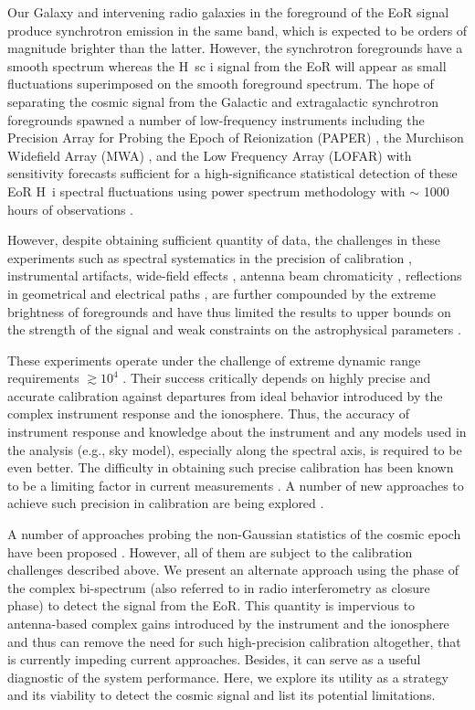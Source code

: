 \documentclass[
reprint,
superscriptaddress,
amsmath,
amssymb,
aps,
]{revtex4-1}
\begin{document}
Our Galaxy and intervening radio galaxies in the foreground of the EoR signal produce synchrotron emission in the same band, which is expected to be orders of magnitude brighter than the latter. However, the synchrotron foregrounds have a smooth spectrum whereas the H~{sc i} signal from the EoR will appear as small fluctuations superimposed on the smooth foreground spectrum. The hope of separating the cosmic signal from the Galactic and extragalactic synchrotron foregrounds spawned a number of low-frequency instruments including the Precision Array for Probing the Epoch of Reionization (PAPER) \cite{par10}, the Murchison Widefield Array (MWA) \cite{tin13}, and the Low Frequency Array (LOFAR) \cite{van13} with sensitivity forecasts sufficient for a high-significance statistical detection of these EoR H~{\sc i} spectral fluctuations using power spectrum methodology with $\sim$ 1000 hours of observations \cite{bea13,thy13}. 

However, despite obtaining sufficient quantity of data, the challenges in these experiments such as spectral systematics in the precision of calibration \cite{barry16}, instrumental artifacts, wide-field effects \cite{thy15a,thy15b}, antenna beam chromaticity \cite{thy16}, reflections in geometrical and electrical paths \cite{thy16}, are further compounded by the extreme brightness of foregrounds and have thus limited the results to upper bounds on the strength of the signal \cite{pac13,ali15,patil17} and weak constraints on the astrophysical parameters \cite{pob15}. 

These experiments operate under the challenge of extreme dynamic range requirements $\gtrsim 10^4$ \cite{dim02,ali08,ber09,ber10,dat10,gho12}. Their success critically depends on highly precise and accurate calibration against departures from ideal behavior introduced by the complex instrument response and the ionosphere. Thus, the accuracy of instrument response and knowledge about the instrument and any models used in the analysis (e.g., sky model), especially along the spectral axis, is required to be even better. The difficulty in obtaining such precise calibration \cite[for e.g.,][]{barry16,tro16} has been known to be a limiting factor in current measurements \cite{ali15,patil16,patil17}. A number of new approaches to achieve such precision in calibration are being explored \cite{liu10,zhe14,sie17,dil17}.

A number of approaches probing the non-Gaussian statistics of the cosmic epoch have been proposed \cite{lid07,bar08,harker09,wat14,kit16,ali06,son15,shi16,maj17}. However, all of them are subject to the calibration challenges described above. We present an alternate approach using the phase of the complex bi-spectrum (also referred to in radio interferometry as closure phase) to detect the signal from the EoR. This quantity is impervious to antenna-based complex gains introduced by the instrument and the ionosphere and thus can remove the need for such high-precision calibration altogether, that is currently impeding current approaches. Besides, it can serve as a useful diagnostic of the system performance. Here, we explore its utility as a strategy and its viability to detect the cosmic signal and list its potential limitations.
\end{document}
